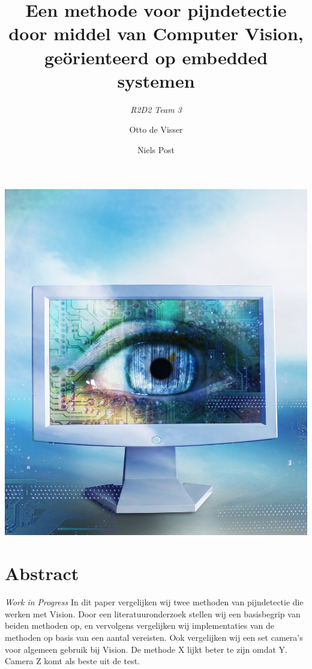 \documentclass[11pt]{article}
\title{Een methode voor pijndetectie door middel van Computer Vision, ge\"{o}rienteerd op embedded systemen}
\author{\emph{R2D2 Team 3} \and Otto de Visser \and Niels Post}
\begin{document}
    \begin{titlepage}
        \centering
        \maketitle
        \includegraphics[height=0.6\textheight]{Images/vision.jpg}
        \clearpage
    \end{titlepage}


    \clearpage
    \tableofcontents

    \clearpage


    \section{Abstract}\label{sec:abstract}
    \emph{Work in Progress}
    In dit paper vergelijken wij twee methoden van pijndetectie die werken met Vision.
    Door een literatuuronderzoek stellen wij een basisbegrip van beiden methoden op, en vervolgens vergelijken wij implementaties van de methoden op basis van een aantal vereisten.
    Ook vergelijken wij een set camera's voor algemeen gebruik bij Vision.
    De methode X lijkt beter te zijn omdat Y.
    Camera Z komt als beste uit de test.
\end{document}
